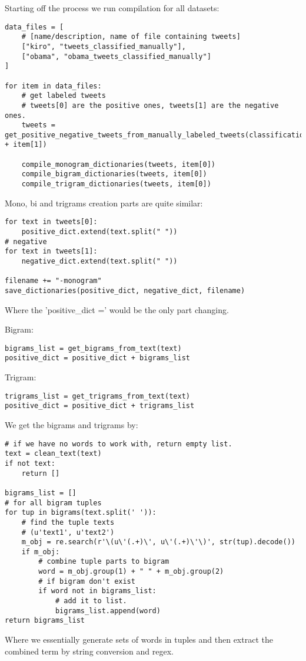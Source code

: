 Starting off the process we run compilation for all datasets: 
\begin{verbatim}
data_files = [
    # [name/description, name of file containing tweets]
    ["kiro", "tweets_classified_manually"],
    ["obama", "obama_tweets_classified_manually"]
]

for item in data_files:
    # get labeled tweets
    # tweets[0] are the positive ones, tweets[1] are the negative ones.
    tweets = get_positive_negative_tweets_from_manually_labeled_tweets(classification_base + item[1])

    compile_monogram_dictionaries(tweets, item[0])
    compile_bigram_dictionaries(tweets, item[0])
    compile_trigram_dictionaries(tweets, item[0])
\end{verbatim}
 
Mono, bi and trigrams creation parts are quite similar: 
\begin{verbatim}
for text in tweets[0]:
    positive_dict.extend(text.split(" "))
# negative
for text in tweets[1]:
    negative_dict.extend(text.split(" "))

filename += "-monogram"
save_dictionaries(positive_dict, negative_dict, filename)
\end{verbatim}

Where the 'positive\_dict =' would be the only part changing.

Bigram:
\begin{verbatim}
bigrams_list = get_bigrams_from_text(text)
positive_dict = positive_dict + bigrams_list
\end{verbatim}

Trigram:
\begin{verbatim}
trigrams_list = get_trigrams_from_text(text)
positive_dict = positive_dict + trigrams_list
\end{verbatim}

We get the bigrams and trigrams by: 
\begin{verbatim}
# if we have no words to work with, return empty list.
text = clean_text(text)
if not text:
    return []

bigrams_list = []
# for all bigram tuples
for tup in bigrams(text.split(' ')):
    # find the tuple texts
    # (u'text1', u'text2')
    m_obj = re.search(r'\(u\'(.+)\', u\'(.+)\'\)', str(tup).decode())
    if m_obj:
        # combine tuple parts to bigram
        word = m_obj.group(1) + " " + m_obj.group(2)
        # if bigram don't exist
        if word not in bigrams_list:
            # add it to list.
            bigrams_list.append(word)
return bigrams_list
\end{verbatim}
Where we essentially generate sets of words in tuples and then extract the
combined term by string conversion and regex. 

